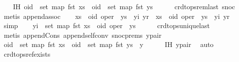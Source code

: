 \begin{isabellebody}
\ \ \isamarkupfalse%
\ IH{\isacharcolon}\ {\isachardoublequoteopen}oid\ {\isasymnotin}\ set\ {\isacharparenleft}map\ fst\ xs{\isacharparenright}\ {\isasymand}\ oid\ {\isasymnotin}\ set\ {\isacharparenleft}map\ fst\ ys{\isacharparenright}{\isachardoublequoteclose}\isanewline
\ \ \ \ \isamarkupfalse%
\ crdt{\isacharunderscore}ops{\isacharunderscore}rem{\isacharunderscore}last\ snoc\ \isamarkupfalse%
\ {\isacharparenleft}metis\ append{\isacharunderscore}assoc{\isacharparenright}\isanewline
\ \ \isamarkupfalse%
\ {\isachardoublequoteopen}{\isacharparenleft}xs\ {\isacharat}\ {\isacharparenleft}oid{\isacharcomma}\ oper{\isacharparenright}\ {\isacharhash}\ ys{\isacharparenright}\ {\isacharat}\ {\isacharbrackleft}{\isacharparenleft}yi{\isacharcomma}\ yr{\isacharparenright}{\isacharbrackright}\ {\isacharequal}\ xs\ {\isacharat}\ {\isacharparenleft}oid{\isacharcomma}\ oper{\isacharparenright}\ {\isacharhash}\ ys\ {\isacharat}\ {\isacharbrackleft}{\isacharparenleft}yi{\isacharcomma}\ yr{\isacharparenright}{\isacharbrackright}{\isachardoublequoteclose}\isanewline
\ \ \ \ \isamarkupfalse%
\ simp\isanewline
\ \ \isamarkupfalse%
\ {\isachardoublequoteopen}yi\ {\isasymnotin}\ set\ {\isacharparenleft}map\ fst\ {\isacharparenleft}xs\ {\isacharat}\ {\isacharparenleft}oid{\isacharcomma}\ oper{\isacharparenright}\ {\isacharhash}\ ys{\isacharparenright}{\isacharparenright}{\isachardoublequoteclose}\isanewline
\ \ \ \ \isamarkupfalse%
\ crdt{\isacharunderscore}ops{\isacharunderscore}unique{\isacharunderscore}last\ \isamarkupfalse%
\ {\isacharparenleft}metis\ append{\isacharunderscore}Cons\ append{\isacharunderscore}self{\isacharunderscore}conv{}\ snoc{\isachardot}prems\ y{\isacharunderscore}pair{\isacharparenright}\isanewline
\ \ \isamarkupfalse%
\ {\isachardoublequoteopen}oid\ {\isasymnotin}\ set\ {\isacharparenleft}map\ fst\ xs{\isacharparenright}\ {\isasymand}\ oid\ {\isasymnotin}\ set\ {\isacharparenleft}map\ fst\ {\isacharparenleft}ys\ {\isacharat}\ {\isacharbrackleft}y{\isacharbrackright}{\isacharparenright}{\isacharparenright}{\isachardoublequoteclose}\isanewline
\ \ \ \ \isamarkupfalse%
\ IH\ y{\isacharunderscore}pair\ \isamarkupfalse%
\ auto\isanewline
{}\isamarkupfalse%
%
\endisatagproof
{\isafoldproof}%
%
\isadelimproof
\isanewline
%
\endisadelimproof
\isanewline
{}\isamarkupfalse%
\ crdt{\isacharunderscore}ops{\isacharunderscore}ref{\isacharunderscore}exists{\isacharcolon}\isanewline

\end{isabellebody}
